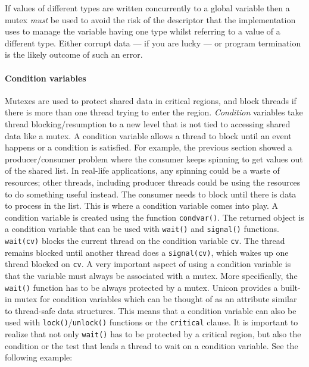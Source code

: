 If values of different types are written concurrently to a global variable then
a mutex {\em must} be used to avoid the risk of the descriptor that the
implementation uses to manage the variable having one type whilst referring to
a value of a different type. Either corrupt data --- if you are lucky --- or
program termination is the likely outcome of such an error.


\paragraph{Condition variables}

Mutexes are used to protect shared data in critical regions, and block threads
if there is more than one thread trying to enter the region.  \emph{Condition}
variables take thread blocking/resumption to a new level that is not tied to
accessing shared data like a mutex. A condition variable allows a thread to
block until an event happens or a condition is satisfied. For example, the
previous section showed a producer/consumer problem where the consumer keeps
spinning to get values out of the shared list. In real-life applications, any
spinning could be a waste of resources; other threads, including producer
threads could be using the resources to do something useful instead. The
consumer needs to block until there is data to process in the list. This is
where a condition variable comes into play.  A condition variable is created
using the function \texttt{condvar()}. The returned object is a condition
variable that can be used with \texttt{wait()} and \texttt{signal()}
functions. \texttt{wait(cv)} blocks the current thread on the condition variable
\texttt{cv}. The thread remains blocked until another thread does a
\texttt{signal(cv)}, which wakes up one thread blocked on \texttt{cv}.  A very
important aspect of using a condition variable is that the variable must always
be associated with a mutex. More specifically, the \texttt{wait()} function has
to be always protected by a mutex.  Unicon provides a built-in mutex for
condition variables which can be thought of as an attribute similar to
thread-safe data structures. This means that a condition variable can also be
used with \texttt{lock()}/\texttt{unlock()} functions or the \texttt{critical} clause. It
is important to realize that not only \texttt{wait()} has to be protected by a
critical region, but also the condition or the test that leads a thread to wait
on a condition variable.  See the following example:


